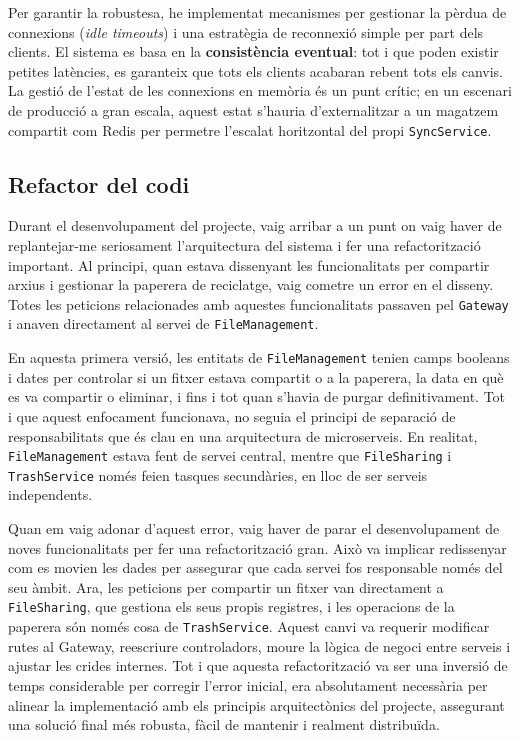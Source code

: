 Per garantir la robustesa, he implementat mecanismes per gestionar la pèrdua de connexions (\textit{idle timeouts}) i una estratègia de reconnexió simple per part dels clients. El sistema es basa en la \textbf{consistència eventual}: tot i que poden existir petites latències, es garanteix que tots els clients acabaran rebent tots els canvis. La gestió de l'estat de les connexions en memòria és un punt crític; en un escenari de producció a gran escala, aquest estat s'hauria d'externalitzar a un magatzem compartit com Redis per permetre l'escalat horitzontal del propi \texttt{SyncService}. 

\subsection{Refactor del codi}

Durant el desenvolupament del projecte, vaig arribar a un punt on vaig haver de replantejar-me seriosament l'arquitectura del sistema i fer una refactorització important. Al principi, quan estava dissenyant les funcionalitats per compartir arxius i gestionar la paperera de reciclatge, vaig cometre un error en el disseny. Totes les peticions relacionades amb aquestes funcionalitats passaven pel \texttt{Gateway} i anaven directament al servei de \texttt{FileManagement}.

En aquesta primera versió, les entitats de \texttt{FileManagement} tenien camps booleans i dates per controlar si un fitxer estava compartit o a la paperera, la data en què es va compartir o eliminar, i fins i tot quan s'havia de purgar definitivament. Tot i que aquest enfocament funcionava, no seguia el principi de separació de responsabilitats que és clau en una arquitectura de microserveis. En realitat, \texttt{FileManagement} estava fent de servei central, mentre que \texttt{FileSharing} i \texttt{TrashService} només feien tasques secundàries, en lloc de ser serveis independents.

Quan em vaig adonar d'aquest error, vaig haver de parar el desenvolupament de noves funcionalitats per fer una refactorització gran. Això va implicar redissenyar com es movien les dades per assegurar que cada servei fos responsable només del seu àmbit. Ara, les peticions per compartir un fitxer van directament a \texttt{FileSharing}, que gestiona els seus propis registres, i les operacions de la paperera són només cosa de \texttt{TrashService}. Aquest canvi va requerir modificar rutes al Gateway, reescriure controladors, moure la lògica de negoci entre serveis i ajustar les crides internes. Tot i que aquesta refactorització va ser una inversió de temps considerable per corregir l'error inicial, era absolutament necessària per alinear la implementació amb els principis arquitectònics del projecte, assegurant una solució final més robusta, fàcil de mantenir i realment distribuïda.

